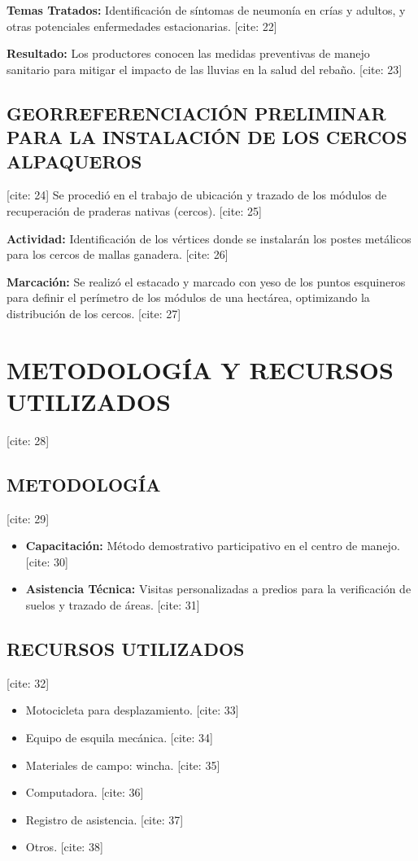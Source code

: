\documentclass[11pt,a4paper]{article}
\begin{document}
\textbf{Temas Tratados:} Identificación de síntomas de neumonía en crías y adultos, y otras potenciales enfermedades estacionarias. [cite: 22]

\textbf{Resultado:} Los productores conocen las medidas preventivas de manejo sanitario para mitigar el impacto de las lluvias en la salud del rebaño. [cite: 23]

\subsection{GEORREFERENCIACIÓN PRELIMINAR PARA LA INSTALACIÓN DE LOS CERCOS ALPAQUEROS} [cite: 24]
Se procedió en el trabajo de ubicación y trazado de los módulos de recuperación de praderas nativas (cercos). [cite: 25]

\textbf{Actividad:} Identificación de los vértices donde se instalarán los postes metálicos para los cercos de mallas ganadera. [cite: 26]

\textbf{Marcación:} Se realizó el estacado y marcado con yeso de los puntos esquineros para definir el perímetro de los módulos de una hectárea, optimizando la distribución de los cercos. [cite: 27]

\section{METODOLOGÍA Y RECURSOS UTILIZADOS} [cite: 28]

\subsection{METODOLOGÍA} [cite: 29]
\begin{itemize}
    \item \textbf{Capacitación:} Método demostrativo participativo en el centro de manejo. [cite: 30]
    \item \textbf{Asistencia Técnica:} Visitas personalizadas a predios para la verificación de suelos y trazado de áreas. [cite: 31]
\end{itemize}

\subsection{RECURSOS UTILIZADOS} [cite: 32]
\begin{itemize}
    \item Motocicleta para desplazamiento. [cite: 33]
    \item Equipo de esquila mecánica. [cite: 34]
    \item Materiales de campo: wincha. [cite: 35]
    \item Computadora. [cite: 36]
    \item Registro de asistencia. [cite: 37]
    \item Otros. [cite: 38]
\end{itemize}
\end{document}
